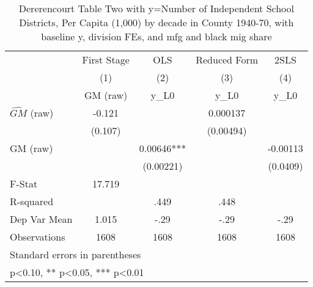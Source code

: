 \begin{table}[htbp]\centering
\def\sym#1{\ifmmode^{#1}\else\(^{#1}\)\fi}
\caption{Dererencourt Table Two with y=Number of Independent School Districts, Per Capita (1,000) by decade in County 1940-70, with baseline y, division FEs, and mfg and black mig share}
\begin{tabular}{l*{4}{c}}
\toprule
                    & First Stage   &         OLS   &Reduced Form   &        2SLS   \\
                    &\multicolumn{1}{c}{(1)}&\multicolumn{1}{c}{(2)}&\multicolumn{1}{c}{(3)}&\multicolumn{1}{c}{(4)}\\
                    &\multicolumn{1}{c}{GM  (raw)}&\multicolumn{1}{c}{y\_L0}&\multicolumn{1}{c}{y\_L0}&\multicolumn{1}{c}{y\_L0}\\
\midrule
$\hat{GM}$ (raw)    &      -0.121   &               &    0.000137   &               \\
                    &     (0.107)   &               &   (0.00494)   &               \\
\addlinespace
GM  (raw)           &               &     0.00646***&               &    -0.00113   \\
                    &               &   (0.00221)   &               &    (0.0409)   \\
\midrule
F-Stat              &      17.719   &               &               &               \\
R-squared           &               &        .449   &        .448   &               \\
Dep Var Mean        &       1.015   &        -.29   &        -.29   &        -.29   \\
Observations        &        1608   &        1608   &        1608   &        1608   \\
\bottomrule
\multicolumn{5}{l}{\footnotesize Standard errors in parentheses}\\
\multicolumn{5}{l}{\footnotesize * p<0.10, ** p<0.05, *** p<0.01}\\
\end{tabular}
\end{table}
